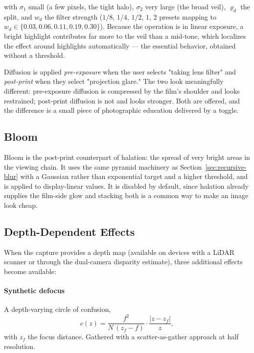 with $\sigma_1$ small (a few pixels, the tight halo), $\sigma_2$ very large (the
broad veil), $\varrho_d$ the split, and $w_d$ the filter strength ($1/8$, $1/4$,
$1/2$, $1$, $2$ presets mapping to $w_d \in \{0.03, 0.06, 0.11, 0.19, 0.30\}$).
Because the operation is in linear exposure, a bright highlight contributes far
more to the veil than a mid-tone, which localizes the effect around highlights
automatically --- the essential behavior, obtained without a threshold.

Diffusion is applied \emph{pre-exposure} when the user selects "taking lens
filter" and \emph{post-print} when they select "projection glare." The two look
meaningfully different: pre-exposure diffusion is compressed by the film's
shoulder and looks restrained; post-print diffusion is not and looks stronger.
Both are offered, and the difference is a small piece of photographic education
delivered by a toggle.

\subsection{Bloom}

Bloom is the post-print counterpart of halation: the spread of very bright areas
in the viewing chain. It uses the same pyramid machinery as
Section~\ref{sec:recursive-blur} with a Gaussian rather than exponential target
and a higher threshold, and is applied to display-linear values. It is disabled
by default, since halation already supplies the film-side glow and stacking both
is a common way to make an image look cheap.

\subsection{Depth-Dependent Effects}

When the capture provides a depth map (available on devices with a LiDAR
scanner or through the dual-camera disparity estimate), three additional effects
become available:

\paragraph{Synthetic defocus} A depth-varying circle of confusion,
\begin{equation}
c(z) = \frac{f^2}{N\,(z_f - f)}\cdot\frac{|z - z_f|}{z},
\end{equation}
with $z_f$ the focus distance. Gathered with a scatter-as-gather approach at
half resolution.

